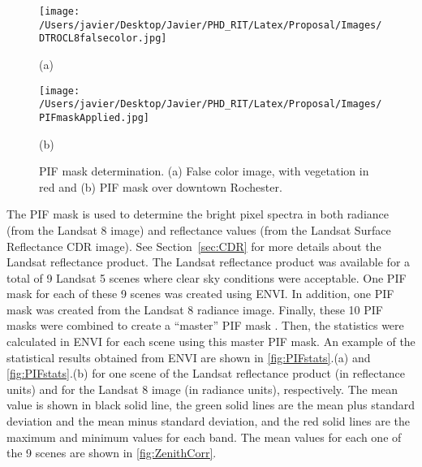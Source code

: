 \begin{figure}[htb]
  \begin{minipage}[c]{0.48\linewidth}
    \centering
      \texttt{[image: /Users/javier/Desktop/Javier/PHD\_RIT/Latex/Proposal/Images/DTROCL8falsecolor.jpg]}  
    \centerline{(a)}\medskip
  \end{minipage}
  \hfill
  \begin{minipage}[d]{0.48\linewidth}
    \centering
      \texttt{[image: /Users/javier/Desktop/Javier/PHD\_RIT/Latex/Proposal/Images/PIFmaskApplied.jpg]}
    \centerline{(b)}\medskip
  \end{minipage}
  \caption{PIF mask determination. (a) False color image, with vegetation in red and (b) PIF mask over downtown Rochester. \label{fig:PIFmask} } 
\end{figure}

The PIF mask is used to determine the bright pixel spectra in both radiance (from the Landsat 8 image) and reflectance values (from the Landsat Surface Reflectance CDR \cite{LandsatCDR} image). See Section~\ref{sec:CDR} for more details about the Landsat reflectance product. The Landsat reflectance product was available for a total of 9 Landsat 5 scenes where clear sky conditions were acceptable. One PIF mask for each of these 9 scenes was created using ENVI. In addition, one PIF mask was created from the Landsat 8 radiance image. Finally, these 10 PIF masks were combined to create a ``master'' PIF mask . Then, the statistics were calculated in ENVI for each scene using this master PIF mask. An example of the statistical results obtained from ENVI are shown in \autoref{fig:PIFstats}.(a) and \autoref{fig:PIFstats}.(b) for one scene of the Landsat reflectance product (in reflectance units) and for the Landsat 8 image (in radiance units), respectively. The mean value is shown in black solid line, the green solid lines are the mean plus standard deviation and the mean minus standard deviation, and the red solid lines are the maximum and minimum values for each band. The mean values for each one of the 9 scenes are shown in \autoref{fig:ZenithCorr}. 

